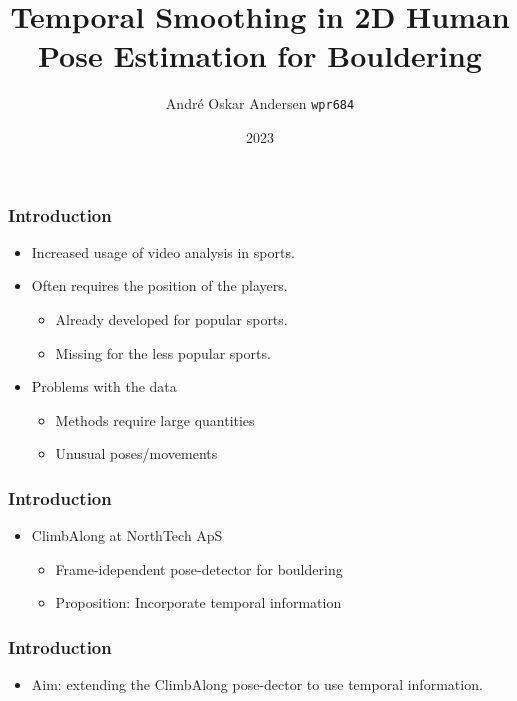 \documentclass{beamer}
\begin{document}
\beamertemplatenavigationsymbolsempty

\title{Temporal Smoothing in 2D Human Pose Estimation for Bouldering}

\author{André Oskar Andersen
\newline \small \texttt{wpr684}}


\date{2023}

\frame{\titlepage}

\begin{frame}
    \frametitle{Introduction}
    \begin{itemize}
        \item<1-3> Increased usage of video analysis in sports.
        \item<2-3> Often requires the position of the players.
        \begin{itemize}
            \item Already developed for popular sports.
            \item Missing for the less popular sports.
        \end{itemize}
        \item<3-3> Problems with the data
        \begin{itemize}
            \item Methods require large quantities
            \item Unusual poses/movements
        \end{itemize}
    \end{itemize}
\end{frame}

\begin{frame}
    \frametitle{Introduction}
    \begin{itemize}
        \item<1-> ClimbAlong at NorthTech ApS
        \begin{itemize}
            \item<1-> Frame-idependent pose-detector for bouldering 
            \item<2-> Proposition: Incorporate temporal information
        \end{itemize}
    \end{itemize}
\end{frame}

\begin{frame}
    \frametitle{Introduction}
    \begin{itemize}
        \item<1-> Aim: extending the ClimbAlong pose-dector to use temporal information.
    \end{itemize}
\end{frame}
\end{document}
